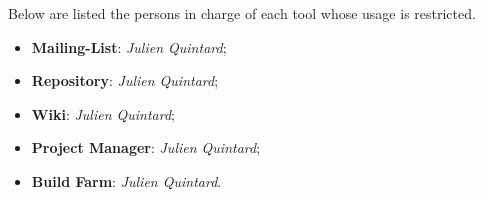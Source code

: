 Below are listed the persons in charge of each tool whose usage is restricted.

\begin{itemize}
  \item
    \textbf{Mailing-List}: \textit{Julien Quintard};
  \item
    \textbf{Repository}: \textit{Julien Quintard};
  \item
    \textbf{Wiki}: \textit{Julien Quintard};
  \item
    \textbf{Project Manager}: \textit{Julien Quintard};
  \item
    \textbf{Build Farm}: \textit{Julien Quintard}.
\end{itemize}

